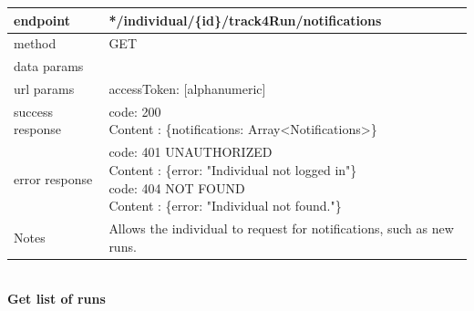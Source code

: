 \begin{legal}
\begin{legal}
\begin{itemize}
								\begin{tabularx}{\linewidth}{| l | l |}
									\hline
									endpoint & */individual/\{id\}/track4Run/notifications \\
									\hline
									method & GET \\
									\hline
									data params & \\
									\hline
									url params &
									\parbox{0.7\textwidth}{
										\bigskip
										accessToken: [alphanumeric]
										\bigskip
									} \\
									\hline
									success response &
									\parbox{0.7\textwidth}{
										\bigskip
										code: 200\\
										Content : \{notifications: Array<Notifications>\}
										\bigskip
									} \\
									\hline
									error response &
									\parbox{0.7\textwidth}{
										\bigskip
										code: 401 UNAUTHORIZED \\
										Content : \{error: "Individual not logged in"\}\\
										code: 404 NOT FOUND \\
										Content : \{error: "Individual not found."\}
										\bigskip
									} \\
									\hline
									Notes & 
									\parbox{0.7\textwidth}{
										\bigskip Allows the individual to request for notifications, such as new runs.
									\bigskip}  \\
									\hline
								\end{tabularx}\\
								
								\textbf{Get list of runs} \\
			

\end{itemize}
\end{legal}
\end{legal}
